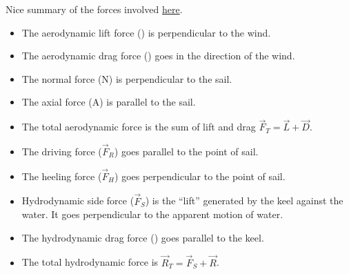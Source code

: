 \documentclass{article}
\begin{document}

Nice summary of the forces involved
\href{http://grizzly.colorado.edu/~rmw/files/papers/PhysicsofSailing.pdf}{here}.

\begin{itemize}
\item The aerodynamic lift force () is perpendicular to the
  wind.
\item The aerodynamic drag force () goes in the direction of
  the wind.
\item The normal force (N) is perpendicular to the sail.
\item The axial force (A) is parallel to the sail.
\item The total aerodynamic force is the sum of lift and drag
  $\overrightarrow{F}_T = \overrightarrow{L} + \overrightarrow{D}$.
\item The driving force ($\overrightarrow{F}_R$) goes parallel to the point of
  sail.
\item The heeling force ($\overrightarrow{F}_H$) goes perpendicular to the point
  of sail.
\item Hydrodynamic side force ($\overrightarrow{F}_S$) is the ``lift'' generated
  by the keel against the water. It goes perpendicular to the apparent motion of
  water.
\item The hydrodynamic drag force () goes parallel to the
  keel.
\item The total hydrodynamic force is $\overrightarrow{R}_T =
  \overrightarrow{F}_S + \overrightarrow{R}$.
\end{itemize}
\end{document}
